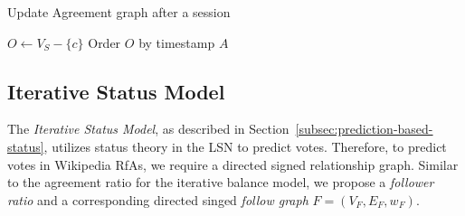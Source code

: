 \begin{algorithm}[H]
    \DontPrintSemicolon
    \caption{Update Agreement graph after a session}
    \label{alg:agree-update}
    $O \leftarrow V_{S}-\{c\}$\;
    Order $O$ by timestamp\;
    \Return $A$
\end{algorithm}

\subsection{Iterative Status Model}
The \textit{Iterative Status Model}, as described in Section~\ref{subsec:prediction-based-status}, utilizes status theory in the LSN to predict votes.
Therefore, to predict votes in Wikipedia RfAs, we require a directed signed relationship graph.
Similar to the agreement ratio for the iterative balance model, we propose a \textit{follower ratio} and a corresponding directed singed \textit{follow graph} $F=(V_{F},E_{F},w_{F})$.

